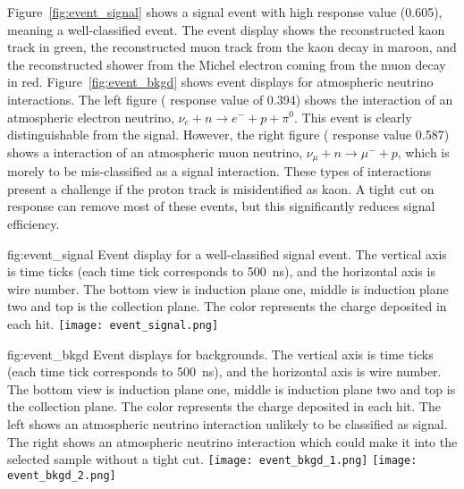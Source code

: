 Figure~\ref{fig:event_signal} shows a signal event with high  response value (\num{0.605}), meaning a well-classified event. The event display shows the reconstructed kaon track in green, the reconstructed muon track from the kaon decay in maroon, and the reconstructed shower from the Michel electron coming from the muon decay in red. Figure~\ref{fig:event_bkgd} shows event displays for atmospheric neutrino interactions.  The left figure ( response value of \num{0.394}) shows the interaction of an atmospheric electron neutrino, $\nu_{e}+n\rightarrow e^{-}+p+\pi^{0}$.  This event is clearly distinguishable from the signal.  However, the right figure ( response value \num{0.587}) shows a  interaction of an atmospheric muon neutrino, $\nu_{\mu}+n \rightarrow \mu^{-}+p$, which is morely to be mis-classified as a signal interaction. These types of interactions present a challenge if the proton track is misidentified as kaon. A tight cut on  response can remove most of these events, but this significantly reduces signal efficiency.


\begin{dunefigure}
{fig:event_signal}
{Event display for a well-classified \ptoknubar signal event.  The vertical axis is time ticks (each time tick corresponds to \SI{500}{\ns}), and the horizontal axis is wire number. The bottom view is induction plane one, middle is induction plane two and top is the collection plane. The color represents the charge deposited in each hit.}
\texttt{[image: event\_signal.png]}
\end{dunefigure} 

\begin{dunefigure}
{fig:event_bkgd}
{Event displays for \ptoknubar backgrounds.  The vertical axis is time ticks (each time tick corresponds to \SI{500}{\ns}), and the horizontal axis is wire number. The bottom view is induction plane one, middle is induction plane two and top is the collection plane. The color represents the charge deposited in each hit. The left shows an atmospheric neutrino interaction unlikely to be classified as signal. The right shows an atmospheric neutrino interaction which could make it into the selected sample without a tight cut.}
\texttt{[image: event\_bkgd\_1.png]}
\texttt{[image: event\_bkgd\_2.png]}
\end{dunefigure}

